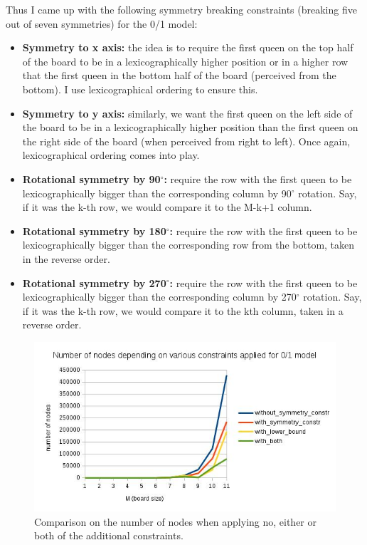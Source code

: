 \documentclass{report}
\begin{document}
Thus I came up with the following symmetry breaking constraints (breaking five out of seven symmetries) for the 0/1 model:
\begin{itemize}
\item \textbf{Symmetry to x axis:} the idea is to require the first queen on the top half of the board to be in a lexicographically higher position or in a higher row that the first queen in the bottom half of the board (perceived from the bottom). I use lexicographical ordering to ensure this. 
\item \textbf{Symmetry to y axis:} similarly, we want the first queen on the left side of the board to be in a lexicographically higher position than the first queen on the right side of the board (when perceived from right to left). Once again, lexicographical ordering comes into play.
\item \textbf{Rotational symmetry by 90$^{\circ}$:} require the row with the first queen to be lexicographically bigger than the corresponding column by 90$^{\circ}$ rotation. Say, if it was the k-th row, we would compare it to the M-k+1 column.
\item \textbf{Rotational symmetry by 180$^{\circ}$:} require the row with the first queen to be lexicographically bigger than the corresponding row from the bottom, taken in the reverse order.
\item \textbf{Rotational symmetry by 270$^{\circ}$:} require the row with the first queen to be lexicographically bigger than the corresponding column by 270$^{\circ}$ rotation. Say, if it was the k-th row, we would compare it to the kth column, taken in a reverse order.
\end{itemize}

\begin{figure} [\textwidth]
\includegraphics[scale=0.6]{images/allConst.jpg}
\caption{Comparison on the number of nodes when applying no, either or both of the additional constraints.}
\end{figure}
\end{document}
